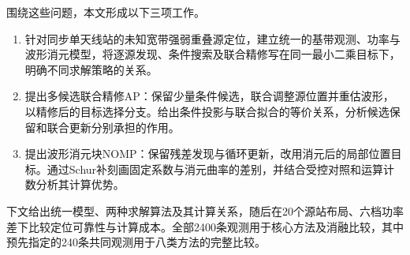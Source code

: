 围绕这些问题，本文形成以下三项工作。
\begin{enumerate}
  \item 针对同步单天线站的未知宽带强弱重叠源定位，建立统一的基带观测、功率与波形消元模型，将逐源发现、条件搜索及联合精修写在同一最小二乘目标下，明确不同求解策略的关系。
  \item 提出多候选联合精修AP：保留少量条件候选，联合调整源位置并重估波形，以精修后的目标选择分支。给出条件投影与联合拟合的等价关系，分析候选保留和联合更新分别承担的作用。
  \item 提出波形消元块NOMP：保留残差发现与循环更新，改用消元后的局部位置目标。通过Schur补刻画固定系数与消元曲率的差别，并结合受控对照和运算计数分析其计算优势。
\end{enumerate}

下文给出统一模型、两种求解算法及其计算关系，随后在20个源站布局、六档功率差下比较定位可靠性与计算成本。全部2400条观测用于核心方法及消融比较，其中预先指定的240条共同观测用于八类方法的完整比较。
